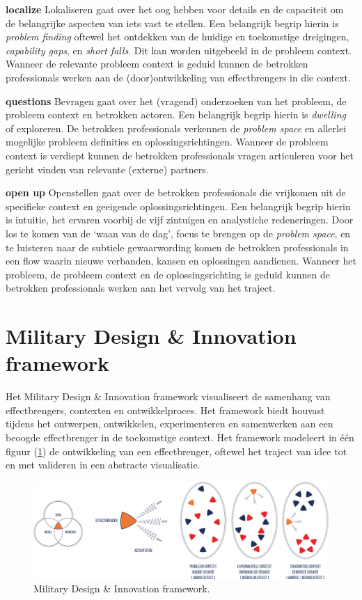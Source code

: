 \documentclass[
]{book}
\begin{document}
\textbf{localize}
Lokaliseren gaat over het oog hebben voor details en de capaciteit om de belangrijke aspecten van iets vast te stellen. Een belangrijk begrip hierin is \emph{problem finding} oftewel het ontdekken van de huidige en toekomstige dreigingen, \emph{capability gaps}, en \emph{short falls}. Dit kan worden uitgebeeld in de probleem context. Wanneer de relevante probleem context is geduid kunnen de betrokken professionals werken aan de (door)ontwikkeling van effectbrengers in die context.

\textbf{questions}
Bevragen gaat over het (vragend) onderzoeken van het probleem, de probleem context en betrokken actoren. Een belangrijk begrip hierin is \emph{dwelling} of exploreren. De betrokken professionals verkennen de \emph{problem space} en allerlei mogelijke probleem definities en oplossingsrichtingen. Wanneer de probleem context is verdiept kunnen de betrokken professionals vragen articuleren voor het gericht vinden van relevante (externe) partners.

\textbf{open up}
Openstellen gaat over de betrokken professionals die vrijkomen uit de specifieke context en geeigende oplossingsrichtingen. Een belangrijk begrip hierin is intuitie, het ervaren voorbij de vijf zintuigen en analystiche redeneringen. Door los te komen van de `waan van de dag', focus te brengen op de \emph{problem space}, en te luisteren naar de subtiele gewaarwording komen de betrokken professionals in een flow waarin nieuwe verbanden, kansen en oplossingen aandienen. Wanneer het probleem, de probleem context en de oplossingsrichting is geduid kunnen de betrokken professionals werken aan het vervolg van het traject.

\hypertarget{military-design-innovation-framework}{%
\section{Military Design \& Innovation framework}\label{military-design-innovation-framework}}

Het Military Design \& Innovation framework visualiseert de samenhang van effectbrengers, contexten en ontwikkelproces. Het framework biedt houvast tijdens het ontwerpen, ontwikkelen, experimenteren en samenwerken aan een beoogde effectbrenger in de toekomstige context. Het framework modeleert in één figuur (\ref{fig:design-model}) de ontwikkeling van een effectbrenger, oftewel het traject van idee tot en met valideren in een abstracte visualisatie.

\begin{figure}

{\centering \includegraphics[width=0.8\linewidth]{data/images/20210324-MDI-design-model} 

}

\caption{Military Design \& Innovation framework.}\label{fig:design-model}
\end{figure}
\end{document}
